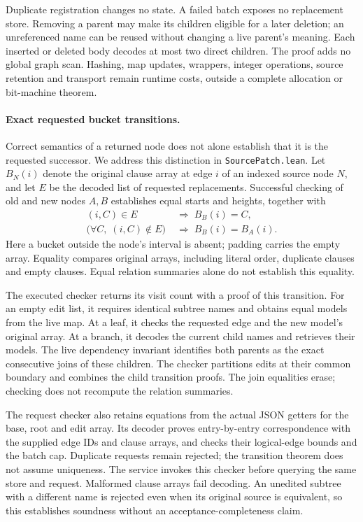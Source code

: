 \documentclass[11pt,a4paper]{article}
\numberwithin{equation}{section}
\theoremstyle{plain}
\theoremstyle{definition}
\theoremstyle{remark}
\begin{document}
Duplicate registration changes no state. A failed batch exposes no replacement store. Removing a parent may make its children eligible for a later deletion; an unreferenced name can be reused without changing a live parent's meaning. Each inserted or deleted body decodes at most two direct children. The proof adds no global graph scan. Hashing, map updates, wrappers, integer operations, source retention and transport remain runtime costs, outside a complete allocation or bit-machine theorem.

\paragraph{Exact requested bucket transitions.}
Correct semantics of a returned node does not alone establish that it is the requested successor. We address this distinction in \texttt{SourcePatch.lean}. Let $B_N(i)$ denote the original clause array at edge $i$ of an indexed source node $N$, and let $E$ be the decoded list of requested replacements. Successful checking of old and new nodes $A,B$ establishes equal starts and heights, together with
\[
\begin{aligned}
(i,C)\in E &\;\Longrightarrow\; B_B(i)=C,\\
\bigl(\forall C,\;(i,C)\notin E\bigr)
  &\;\Longrightarrow\; B_B(i)=B_A(i).
\end{aligned}
\]
Here a bucket outside the node's interval is absent; padding carries the empty array. Equality compares original arrays, including literal order, duplicate clauses and empty clauses. Equal relation summaries alone do not establish this equality.

The executed checker returns its visit count with a proof of this transition. For an empty edit list, it requires identical subtree names and obtains equal models from the live map. At a leaf, it checks the requested edge and the new model's original array. At a branch, it decodes the current child names and retrieves their models. The live dependency invariant identifies both parents as the exact consecutive joins of these children. The checker partitions edits at their common boundary and combines the child transition proofs. The join equalities erase; checking does not recompute the relation summaries.

The request checker also retains equations from the actual JSON getters for the base, root and edit array. Its decoder proves entry-by-entry correspondence with the supplied edge IDs and clause arrays, and checks their logical-edge bounds and the batch cap. Duplicate requests remain rejected; the transition theorem does not assume uniqueness. The service invokes this checker before querying the same store and request. Malformed clause arrays fail decoding. An unedited subtree with a different name is rejected even when its original source is equivalent, so this establishes soundness without an acceptance-completeness claim.
\end{document}
